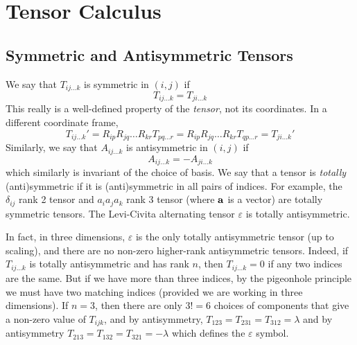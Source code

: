 \documentclass{article}
\begin{document}
\section{Tensor Calculus}
\subsection{Symmetric and Antisymmetric Tensors}
We say that $T_{ij\dots k}$ is symmetric in $(i, j)$ if
\[ T_{ij\dots k} = T_{ji\dots k} \]
This really is a well-defined property of the \textit{tensor}, not its coordinates. In a different coordinate frame,
\[ T_{ij\dots k}' = R_{ip}R_{jq}\dots R_{kr} T_{pq\dots r} = R_{ip}R_{jq}\dots R_{kr} T_{qp\dots r} = T_{ji\dots k}' \]
Similarly, we say that $A_{ij\dots k}$ is antisymmetric in $(i, j)$ if
\[ A_{ij\dots k} = -A_{ji\dots k} \]
which similarly is invariant of the choice of basis. We say that a tensor is \textit{totally} (anti)symmetric if it is (anti)symmetric in all pairs of indices. For example, the $\delta_{ij}$ rank 2 tensor and $a_ia_ja_k$ rank 3 tensor (where $\vb a$ is a vector) are totally symmetric tensors. The Levi-Civita alternating tensor $\varepsilon$ is totally antisymmetric.

In fact, in three dimensions, $\varepsilon$ is the only totally antisymmetric tensor (up to scaling), and there are no non-zero higher-rank antisymmetric tensors. Indeed, if $T_{ij\dots k}$ is totally antisymmetric and has rank $n$, then $T_{ij\dots k} = 0$ if any two indices are the same. But if we have more than three indices, by the pigeonhole principle we must have two matching indices (provided we are working in three dimensions). If $n=3$, then there are only $3! = 6$ choices of components that give a non-zero value of $T_{ijk}$, and by antisymmetry, $T_{123} = T_{231} = T_{312} = \lambda$ and by antisymmetry $T_{213} = T_{132} = T_{321} = -\lambda$ which defines the $\varepsilon$ symbol.
\end{document}
